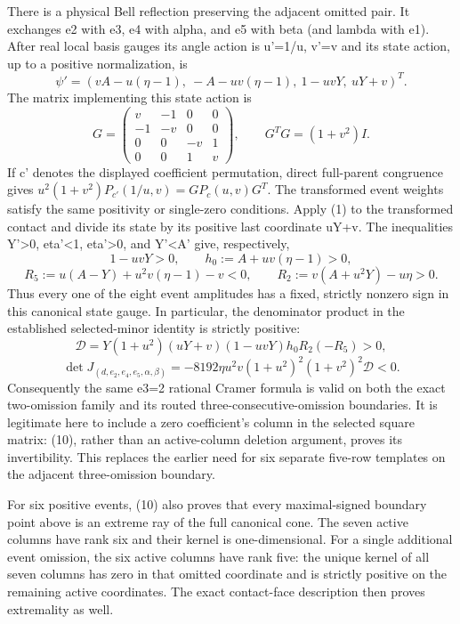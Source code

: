 There is a physical Bell reflection preserving the adjacent omitted pair.
It exchanges e2 with e3, e4 with alpha, and e5 with beta (and lambda with
e1). After real local basis gauges its angle action is u'=1/u, v'=v and
its state action, up to a positive normalization, is
\[
\psi'=(vA-u(\eta-1),\ -A-uv(\eta-1),\ 1-uvY,\ uY+v)^T.
\tag{8}
\]
The matrix implementing this state action is
\[
G=\begin{pmatrix}v&-1&0&0\\-1&-v&0&0\\0&0&-v&1\\0&0&1&v\end{pmatrix},
\qquad G^TG=(1+v^2)I.
\]
If c' denotes the displayed coefficient permutation, direct full-parent
congruence gives \(u^2(1+v^2)P_{c'}(1/u,v)=GP_c(u,v)G^T\).
The transformed event weights satisfy the same positivity or single-zero
conditions. Apply (1) to the transformed contact and divide its state by
its positive last coordinate uY+v. The inequalities Y'\textgreater0, eta'\textless1,
eta'\textgreater0, and Y'\textless A' give, respectively,
\[
1-uvY>0,\qquad h_0:=A+uv(\eta-1)>0,
\]
\[
R_5:=u(A-Y)+u^2v(\eta-1)-v<0,
\qquad R_2:=v(A+u^2Y)-u\eta>0.
\tag{9}
\]
Thus every one of the eight event amplitudes has a fixed, strictly nonzero
sign in this canonical state gauge. In particular, the denominator product
in the established selected-minor identity is strictly positive:
\[
\mathcal D=Y(1+u^2)(uY+v)(1-uvY)h_0R_2(-R_5)>0,
\]
\[
\det J_{(d,e_2,e_4,e_5,\alpha,\beta)}
=-8192\eta u^2v(1+u^2)^2(1+v^2)^2\mathcal D<0.
\tag{10}
\]
Consequently the same e3=2 rational Cramer formula is valid on both the
exact two-omission family and its routed three-consecutive-omission
boundaries. It is legitimate here to include a zero coefficient's column
in the selected square matrix: (10), rather than an active-column deletion
argument, proves its invertibility. This replaces the earlier need for six
separate five-row templates on the adjacent three-omission boundary.

For six positive events, (10) also proves that every maximal-signed
boundary point above is an extreme ray of the full canonical cone. The
seven active columns have rank six and their kernel is one-dimensional.
For a single additional event omission, the six active columns have rank
five: the unique kernel of all seven columns has zero in that omitted
coordinate and is strictly positive on the remaining active coordinates.
The exact contact-face description then proves extremality as well.

